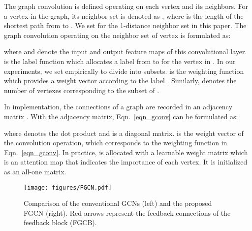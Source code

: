 \documentclass[runningheads]{llncs}
\begin{document}
The graph convolution is defined operating on each vertex and its neighbors. For a vertex  in the graph, its neighbor set is denoted as , where  is the length of the shortest path from  to . We set  for the 1-distance neighbor set in this paper.
The graph convolution operating on the neighbor set of vertex  is formulated as:

where  and  denote the input and output feature maps of this convolutional layer.  is the label function which allocates a label from  to  for the vertex in . In our experiments, we set  empirically to divide  into  subsets.  is the weighting function which provides a weight vector according to the label . Similarly,  denotes the number of vertexes corresponding to the subset of .

In implementation, the connections of a graph are recorded in an  adjacency matrix . With the adjacency matrix, Eqn.~\ref{eqn_gconv} can be formulated as:

where  denotes the dot product and  is a diagonal matrix.  is the weight vector of the convolution operation, which corresponds to the weighting function  in Eqn.~\ref{eqn_gconv}. In practice,  is allocated with a learnable weight matrix  which is an  attention map that indicates the importance of each vertex. It is initialized as an all-one matrix.

\begin{figure}[t]
	\centering
	\texttt{[image: figures/FGCN.pdf]}
	\caption{Comparison of the conventional GCNs (left) and the proposed FGCN (right). Red arrows represent the feedback connections of the feedback block (FGCB).}
	\vspace{-4mm}
	\label{fig-fgcn}
\end{figure}
\end{document}
